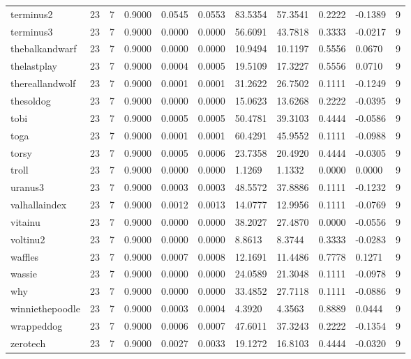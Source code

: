 \begin{table}[htbp]
\begin{tabular}{lllllllllll}
terminus2 & 23 & 7 & 0.9000 & 0.0545 & 0.0553 & 83.5354 & 57.3541 & 0.2222 & -0.1389 & 9 \\
terminus3 & 23 & 7 & 0.9000 & 0.0000 & 0.0000 & 56.6091 & 43.7818 & 0.3333 & -0.0217 & 9 \\
thebalkandwarf & 23 & 7 & 0.9000 & 0.0000 & 0.0000 & 10.9494 & 10.1197 & 0.5556 & 0.0670 & 9 \\
thelastplay & 23 & 7 & 0.9000 & 0.0004 & 0.0005 & 19.5109 & 17.3227 & 0.5556 & 0.0710 & 9 \\
thereallandwolf & 23 & 7 & 0.9000 & 0.0001 & 0.0001 & 31.2622 & 26.7502 & 0.1111 & -0.1249 & 9 \\
thesoldog & 23 & 7 & 0.9000 & 0.0000 & 0.0000 & 15.0623 & 13.6268 & 0.2222 & -0.0395 & 9 \\
tobi & 23 & 7 & 0.9000 & 0.0005 & 0.0005 & 50.4781 & 39.3103 & 0.4444 & -0.0586 & 9 \\
toga & 23 & 7 & 0.9000 & 0.0001 & 0.0001 & 60.4291 & 45.9552 & 0.1111 & -0.0988 & 9 \\
torsy & 23 & 7 & 0.9000 & 0.0005 & 0.0006 & 23.7358 & 20.4920 & 0.4444 & -0.0305 & 9 \\
troll & 23 & 7 & 0.9000 & 0.0000 & 0.0000 & 1.1269 & 1.1332 & 0.0000 & 0.0000 & 9 \\
uranus3 & 23 & 7 & 0.9000 & 0.0003 & 0.0003 & 48.5572 & 37.8886 & 0.1111 & -0.1232 & 9 \\
valhallaindex & 23 & 7 & 0.9000 & 0.0012 & 0.0013 & 14.0777 & 12.9956 & 0.1111 & -0.0769 & 9 \\
vitainu & 23 & 7 & 0.9000 & 0.0000 & 0.0000 & 38.2027 & 27.4870 & 0.0000 & -0.0556 & 9 \\
voltinu2 & 23 & 7 & 0.9000 & 0.0000 & 0.0000 & 8.8613 & 8.3744 & 0.3333 & -0.0283 & 9 \\
waffles & 23 & 7 & 0.9000 & 0.0007 & 0.0008 & 12.1691 & 11.4486 & 0.7778 & 0.1271 & 9 \\
wassie & 23 & 7 & 0.9000 & 0.0000 & 0.0000 & 24.0589 & 21.3048 & 0.1111 & -0.0978 & 9 \\
why & 23 & 7 & 0.9000 & 0.0000 & 0.0000 & 33.4852 & 27.7118 & 0.1111 & -0.0886 & 9 \\
winniethepoodle & 23 & 7 & 0.9000 & 0.0003 & 0.0004 & 4.3920 & 4.3563 & 0.8889 & 0.0444 & 9 \\
wrappeddog & 23 & 7 & 0.9000 & 0.0006 & 0.0007 & 47.6011 & 37.3243 & 0.2222 & -0.1354 & 9 \\
zerotech & 23 & 7 & 0.9000 & 0.0027 & 0.0033 & 19.1272 & 16.8103 & 0.4444 & -0.0320 & 9 \\

\end{tabular}
\end{table}
